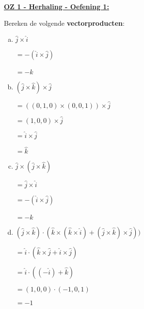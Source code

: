 \textbf{\underline{OZ 1 - Herhaling - Oefening 1:}}
\vspace{0.5cm}

Bereken de volgende \textbf{vectorproducten}:

\begin{enumerate}[(a)]
    \item 
        $ \hat{j} \times \hat{i} $  
    
          \hspace{0.5cm} $ = -(\hat{i} \times \hat{j}) $

          \hspace{0.5cm} $ = -\hat{k} $
    
    \item $ \left( \hat{j} \times \hat{k} \right) \times \hat{j} $
    
          \hspace{0.5cm} $ = \left( \left( 0, 1, 0 \right) \times \left( 0, 0, 1 \right) \right) \times \hat{j} $
    
          \hspace{0.5cm} $ = \left( 1, 0, 0 \right) \times \hat{j} $
    
          \hspace{0.5cm} $ = \hat{i} \times \hat{j} $
    
          \hspace{0.5cm} $ = \hat{k} $
    
    \item $ \hat{j} \times \left( \hat{j} \times \hat{k} \right) $
    
          \hspace{0.5cm} $ = \hat{j} \times \hat{i} $
    
          \hspace{0.5cm} $ = -(\hat{i} \times \hat{j})$
    
          \hspace{0.5cm} $ = -\hat{k} $
    
    \item $ (\hat{j} \times \hat{k}) \cdot (\hat{k} \times (\hat{k} \times \hat{i}) + (\hat{j} \times \hat{k}) \times \hat{j})) $

          \hspace{0.5cm} $ = \hat{i} \cdot (\hat{k} \times \hat{j} + \hat{i} \times \hat{j}) $

          \hspace{0.5cm} $ = \hat{i} \cdot ((-\hat{i}) + \hat{k}) $

          \hspace{0.5cm} $ = (1,0,0) \cdot (-1,0,1) $

          \hspace{0.5cm} $ = -1 $
\end{enumerate}

\vspace{1cm}